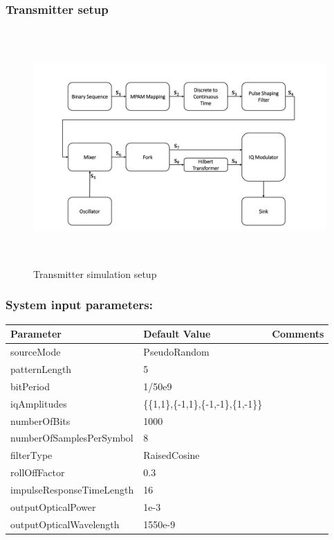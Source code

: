 \subsubsection{Transmitter setup}
\begin{center}
\begin{figure}[h]
	\centering
	\includegraphics[width=1\textwidth, height=9cm]{./sdf/simplified_coherent_receiver/figures/Simulation_setup_Tx.pdf}
	\caption{Transmitter simulation setup}\label{Simulation_setup_Tx}
\end{figure}
\end{center}
\subsubsection{System input parameters:}
\begin{center}
	\begin{tabular}{ |p{5cm}||p{4.5cm}|p{4.5cm}|  }
		\hline
		\textbf{Parameter} &  \textbf{Default Value} & \textbf{Comments}\\
		\hline
		sourceMode    & PseudoRandom &\\
		\hline
		patternLength & 5      & \\
		\hline
		bitPeriod     & 1/50e9 & \\
		\hline
		iqAmplitudes  &\{\{1,1\},\{-1,1\},\{-1,-1\},\{1,-1\}\} &\\
		\hline
		numberOfBits  &   1000 & \\
		\hline
		numberOfSamplesPerSymbol& 8  &\\
		\hline
		filterType& RaisedCosine  &\\
		\hline
		rollOffFactor & 0.3    & \\
		\hline
		impulseResponseTimeLength&16&\\
		\hline
		outputOpticalPower&1e-3&\\
		\hline
		outputOpticalWavelength&1550e-9&\\
		\hline
	\end{tabular}
\end{center}
\vspace{0cm}
